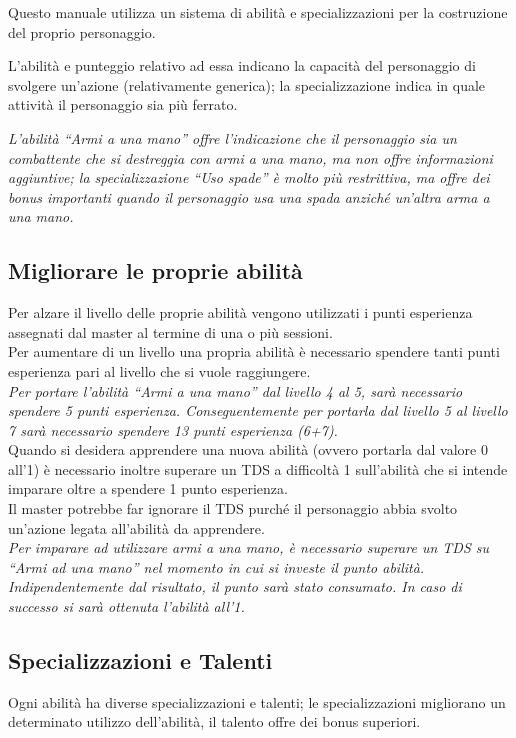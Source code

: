 \documentclass[../manuale_main.tex]{subfiles}
\begin{document}
Questo manuale utilizza un sistema di abilità e specializzazioni per la costruzione del proprio personaggio.

L'abilità e punteggio relativo ad essa indicano la capacità del personaggio di svolgere un'azione (relativamente generica); la specializzazione indica in quale attività il personaggio sia più ferrato.

 \emph{L'abilità ``Armi a una mano” offre l'indicazione che il personaggio sia un combattente che si destreggia con armi a una mano, ma non offre informazioni aggiuntive; la specializzazione ``Uso spade” è molto più restrittiva, ma offre dei bonus importanti quando il personaggio usa una spada anziché un'altra arma a una mano.}

\subsection{Migliorare le proprie abilità}
Per alzare il livello delle proprie abilità vengono utilizzati i punti esperienza assegnati dal master al termine di una o più sessioni.\\
Per aumentare di un livello una propria abilità è necessario spendere tanti punti esperienza pari al livello che si vuole raggiungere.\\
\emph{Per portare l'abilità ``Armi a una mano” dal livello 4 al 5, sarà necessario spendere 5 punti esperienza. Conseguentemente per portarla dal livello 5 al livello 7 sarà necessario spendere 13 punti esperienza (6+7).}\\
Quando si desidera apprendere una nuova abilità (ovvero portarla dal valore 0 all'1) è necessario inoltre superare un TDS a difficoltà 1 sull'abilità che si intende imparare oltre a spendere 1 punto esperienza. \\
Il master potrebbe far ignorare il TDS purché il personaggio abbia svolto un'azione legata all'abilità da apprendere.\\
\emph{Per imparare ad utilizzare armi a una mano, è necessario superare un TDS su ``Armi ad una mano” nel momento in cui si investe il punto abilità. Indipendentemente dal risultato, il punto sarà stato consumato. In caso di successo si sarà ottenuta l'abilità all'1.}

\subsection{Specializzazioni e Talenti}
Ogni abilità ha diverse specializzazioni e talenti; le specializzazioni migliorano un determinato utilizzo dell'abilità, il talento offre dei bonus superiori.
\end{document}
